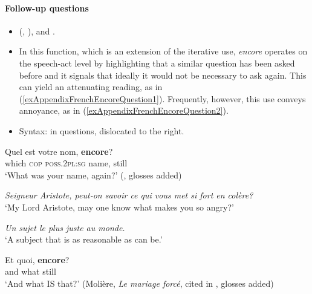 \paragraph{Follow-up questions}
\begin{itemize}
	\item \citeauthor{MosegaardHansen2002} (\citeyear{MosegaardHansen2002}, \citeyear[213–214]{MosegaardHansen2008}), \textcite[105]{Noelke1983} and \textcite{Vaelikangas1982}.
	\item In this function, which is an extension of the iterative use, \textit{encore} operates on the speech-act level by highlighting that a similar question has been asked before and it signals that ideally it would not be necessary to ask again. This can yield an attenuating reading, as in (\ref{exAppendixFrenchEncoreQuestion1}). Frequently, however, this use conveys annoyance, as in  (\ref{exAppendixFrenchEncoreQuestion2}).
	\item Syntax: in questions, dislocated to the right.
\end{itemize}
\begin{exe}
	\ex\label{exAppendixFrenchEncoreQuestion1}
	\gll Quel est votre nom, \textbf{encore}?\\
	which \textsc{cop} \textsc{poss}.2\textsc{pl}:\textsc{sg} name, still\\
	\glt \lq What was your name, again?'
(\cite[46]{MosegaardHansen2002}, glosses added)
	
	\ex\label{exAppendixFrenchEncoreQuestion2}
	\begin{xlist}
		\textit{Seigneur Aristote, peut-on savoir ce qui vous met si fort en colère?}\\
		\lq My Lord Aristote, may one know what makes you so angry?'
		
		\textit{Un sujet le plus juste au monde.}\\
		\lq A subject that is as reasonable as can be.'
	
		 \gll Et quoi, \textbf{encore}?\\
		and what still\\
		\glt \lq And what IS that?' (Molière, \textit{Le mariage forcé}, cited in \cite[214]{MosegaardHansen2008}, glosses added)
	\end{xlist}
\end{exe}

